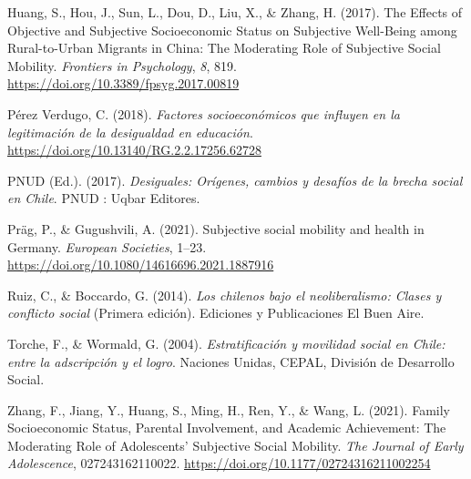 \documentclass[
]{article}
\begin{document}
\leavevmode\hypertarget{ref-huang_Effects_2017}{}%
Huang, S., Hou, J., Sun, L., Dou, D., Liu, X., \& Zhang, H. (2017). The
Effects of Objective and Subjective Socioeconomic Status on Subjective
Well-Being among Rural-to-Urban Migrants in China: The Moderating Role
of Subjective Social Mobility. \emph{Frontiers in Psychology}, \emph{8},
819. \url{https://doi.org/10.3389/fpsyg.2017.00819}

\leavevmode\hypertarget{ref-perezverdugo_Factores_2018}{}%
Pérez Verdugo, C. (2018). \emph{Factores socioeconómicos que influyen en
la legitimación de la desigualdad en educación}.
\url{https://doi.org/10.13140/RG.2.2.17256.62728}

\leavevmode\hypertarget{ref-pnud_Desiguales_2017}{}%
PNUD (Ed.). (2017). \emph{Desiguales: Orígenes, cambios y desafíos de la
brecha social en Chile}. PNUD : Uqbar Editores.

\leavevmode\hypertarget{ref-prag_Subjective_2021}{}%
Präg, P., \& Gugushvili, A. (2021). Subjective social mobility and
health in Germany. \emph{European Societies}, 1--23.
\url{https://doi.org/10.1080/14616696.2021.1887916}

\leavevmode\hypertarget{ref-ruiz_chilenos_2014}{}%
Ruiz, C., \& Boccardo, G. (2014). \emph{Los chilenos bajo el
neoliberalismo: Clases y conflicto social} (Primera edición). Ediciones
y Publicaciones El Buen Aire.

\leavevmode\hypertarget{ref-torche_Estratificacion_2004}{}%
Torche, F., \& Wormald, G. (2004). \emph{Estratificación y movilidad
social en Chile: entre la adscripción y el logro}. Naciones Unidas,
CEPAL, División de Desarrollo Social.

\leavevmode\hypertarget{ref-zhang_Family_2021}{}%
Zhang, F., Jiang, Y., Huang, S., Ming, H., Ren, Y., \& Wang, L. (2021).
Family Socioeconomic Status, Parental Involvement, and Academic
Achievement: The Moderating Role of Adolescents' Subjective Social
Mobility. \emph{The Journal of Early Adolescence}, 027243162110022.
\url{https://doi.org/10.1177/02724316211002254}
\end{document}
